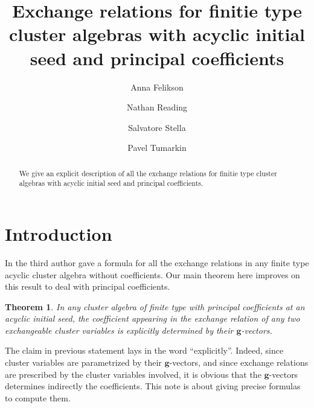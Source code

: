\documentclass[11pt]{amsart}
\newcommand{\bg}{\mathbf{g}}
\newtheorem{theorem}{Theorem}[section]
\numberwithin{equation}{section}
\begin{document}
\title[Exchange relations for finite type]{Exchange relations for finitie type cluster algebras with acyclic initial seed and principal coefficients}

\author[Felikson]{Anna Felikson}
\address[Anna Felikson]{Durham University}

\author[Reading]{Nathan Reading}
\address[Nathan Reading]{North Carolina State Univesity}

\author[Stella]{Salvatore Stella}
\address[Salvatore Stella]{IN$d$AM - Marie Curie Actions fellow, Universit\`a\`{ }La Sapienza'', Roma, Italy.}

\author[tumarkin]{Pavel Tumarkin}
\address[Pavel Tumarkin]{Durham University}

\begin{abstract}
We give an explicit description of all the exchange relations for finitie type cluster algebras with acyclic initial seed and principal coefficients.
\end{abstract}

\maketitle

\section{Introduction}
  In \cite{Ste13} the third author gave a formula for all the exchange relations in any finite type acyclic cluster algebra without coefficients.
  Our main theorem here improves on this result to deal with principal coefficients.
  
  \begin{theorem}
    \label{thm:main_vague}
    In any cluster algebra of finite type with principal coefficients at an acyclic initial seed, the coefficient appearing in the exchange relation of any two exchangeable cluster variables is \emph{explicitly} determined by their $\bg$-vectors. 
  \end{theorem}
  
  The claim in previous statement lays in the word ``explicitly''. 
  Indeed, since cluster variables are parametrized by their $\bg$-vectors, and since exchange relations are prescribed by the cluster variables involved, it is obvious that the $\bg$-vectors determines indirectly the coefficients. 
  This note is about giving precise formulas to compute them.
 
\end{document}
